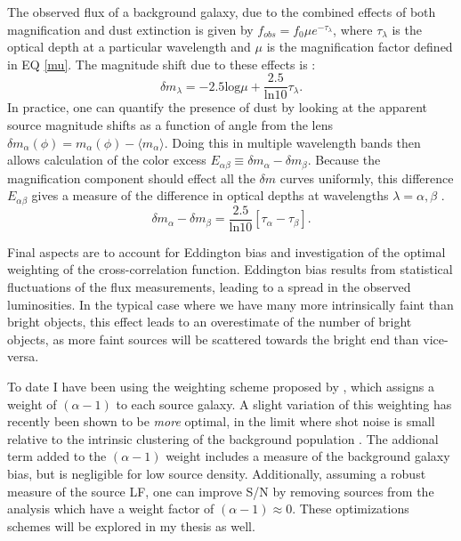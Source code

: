 \documentclass{article}
\begin{document}
The observed flux of a background galaxy, due to the combined effects of both magnification and dust extinction is given by $f_{obs}=f_0 \mu e^{-\tau_{\lambda}}$, where $\tau_{\lambda}$ is the optical depth at a particular wavelength and $\mu$ is the magnification factor defined in EQ \ref{mu}. The magnitude shift due to these effects is \citep{Menard10}:
\begin{equation}
\delta m_{\lambda}=-2.5\mathrm{log}\mu + \frac{2.5}{\mathrm{ln}10}\tau_{\lambda}.
\end{equation}
In practice, one can quantify the presence of dust by looking at the apparent source magnitude shifts as a function of angle from the lens $\delta m_\alpha (\phi) = m_\alpha (\phi) - \langle m_\alpha \rangle$. Doing this in multiple wavelength bands then allows calculation of the color excess $E_{\alpha \beta} \equiv \delta m_\alpha - \delta m_\beta$. Because the magnification component should effect all the $\delta m$ curves uniformly, this difference $E_{\alpha \beta}$ gives a measure of the difference in optical depths at wavelengths $\lambda = \alpha, \beta$ \citep{Menard10}.
\begin{equation}
\delta m_\alpha - \delta m_\beta = \frac{2.5}{\mathrm{ln}10}[ \tau_\alpha - \tau_\beta ].
\end{equation}

Final aspects are to account for Eddington bias and investigation of the optimal weighting of the cross-correlation function. Eddington bias results from statistical fluctuations of the flux measurements, leading to a spread in the observed luminosities.  In the typical case where we have many more intrinsically faint than bright objects, this effect leads to an overestimate of the number of bright objects, as more faint sources will be scattered towards the bright end than vice-versa.

To date I have been using the weighting scheme proposed by \citet{Menard03}, which assigns a weight of $(\alpha-1)$ to each source galaxy. A slight variation of this weighting has recently been shown to be {\it more} optimal, in the limit where shot noise is small relative to the intrinsic clustering of the background population \citep{Yang11}.  The addional term added to the $(\alpha-1)$ weight includes a measure of the background galaxy bias, but is negligible for low source density. Additionally, assuming a robust measure of the source LF, one can improve S/N by removing sources from the analysis which have a weight factor of $(\alpha-1) \approx 0$. These optimizations schemes will be explored in my thesis as well.
\end{document}
